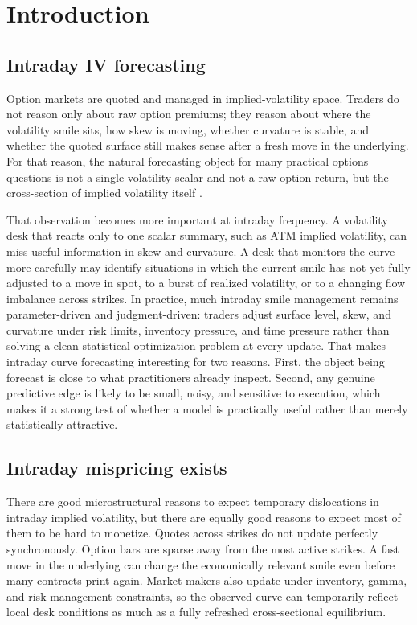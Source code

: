 \documentclass[12pt]{report}
\begin{document}
\cleardoublepage
\begingroup
\setlength{\parskip}{0pt}
\setlength{\itemsep}{0pt}
\renewcommand{\baselinestretch}{0.95}

\tableofcontents
\endgroup

\cleardoublepage
\setcounter{page}{1}
\hypersetup{pageanchor=true}

\chapter{Introduction}

\section{Intraday IV forecasting}
Option markets are quoted and managed in implied-volatility space. Traders do not reason only about raw option premiums; they reason about where the volatility smile sits, how skew is moving, whether curvature is stable, and whether the quoted surface still makes sense after a fresh move in the underlying. For that reason, the natural forecasting object for many practical options questions is not a single volatility scalar and not a raw option return, but the cross-section of implied volatility itself \citep{black1973,dumas1998,cont2002dynamics}.

That observation becomes more important at intraday frequency. A volatility desk that reacts only to one scalar summary, such as ATM implied volatility, can miss useful information in skew and curvature. A desk that monitors the curve more carefully may identify situations in which the current smile has not yet fully adjusted to a move in spot, to a burst of realized volatility, or to a changing flow imbalance across strikes. In practice, much intraday smile management remains parameter-driven and judgment-driven: traders adjust surface level, skew, and curvature under risk limits, inventory pressure, and time pressure rather than solving a clean statistical optimization problem at every update. That makes intraday curve forecasting interesting for two reasons. First, the object being forecast is close to what practitioners already inspect. Second, any genuine predictive edge is likely to be small, noisy, and sensitive to execution, which makes it a strong test of whether a model is practically useful rather than merely statistically attractive.

\section{Intraday mispricing exists}
There are good microstructural reasons to expect temporary dislocations in intraday implied volatility, but there are equally good reasons to expect most of them to be hard to monetize. Quotes across strikes do not update perfectly synchronously. Option bars are sparse away from the most active strikes. A fast move in the underlying can change the economically relevant smile even before many contracts print again. Market makers also update under inventory, gamma, and risk-management constraints, so the observed curve can temporarily reflect local desk conditions as much as a fully refreshed cross-sectional equilibrium.
\end{document}
